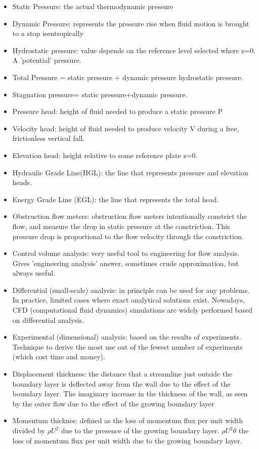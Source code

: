 \begin{itemize}
    \item Static Pressure: the actual thermodynamic pressure
    \item Dynamic Pressure: represents the pressure rise when fluid motion is brought to a stop isentropically
    \item Hydrostatic pressure: value depends on the reference level selected where z=0. A 'potential' pressure.
    \item Total Pressure = static pressure + dynamic pressure hydrostatic pressure.
    \item Stagnation pressure= static pressure+dynamic pressure.
    \item Pressure head: height of fluid needed to produce a static pressure P
    \item Velocity head: height of fluid needed to produce velocity V during a free, frictionless vertical fall.
    \item Elevation head: height relative to some reference plate z=0.
    \item Hydraulic Grade Line(HGL): the line that represents pressure and elevation heads.
    \item Energy Grade Line (EGL): the line that represents the total head.
    \item Obstruction flow meters: obstruction flow meters intentionally constrict the flow, and measure the drop in static pressure at the constriction. This pressure drop is proportional to the flow velocity through the constriction.
    \item Control volume analysis: very useful tool to engineering for flow analysis. Gives 'engineering analysis' answer, sometimes crude approximation, but always useful.
    \item Differential (small-scale) analysis: in principle can be used for any problems. In practice, limited cases where exact analytical solutions exist. Nowadays, CFD (computational fluid dynamics) simulations are widely performed based on differential analysis.
    \item Experimental (dimensional) analysis: based on the results of experiments. Technique to derive the most use out of the fewest number of experiments (which cost time and money).
    \item Displacement thickness: the distance that a streamline just outside the boundary layer is deflected away from the wall due to the effect of the boundary layer. The imaginary increase in the thickness of the wall, as seen by the outer flow due to the effect of the growing boundary layer
    \item Momentum thicknes: defined as the loss of momentum flux per unit width divided by $\rho U^2$ due to the presence of the growing boundary layer. $\rho U^2 \theta$ the loss of momentum flux per unit width due to the growing boundary layer.
\end{itemize}

